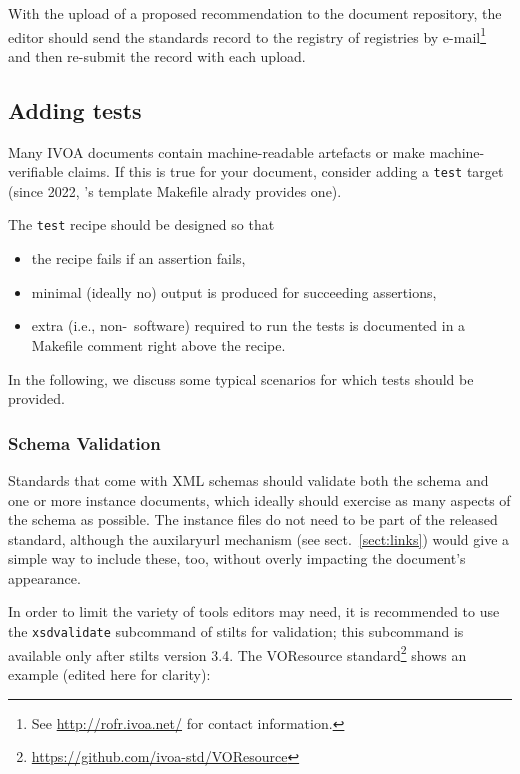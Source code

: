 \documentclass[11pt,a4paper]{ivoa}
\begin{document}
With the upload of a proposed recommendation to the document repository,
the editor should send the standards record to the registry of
registries by e-mail\footnote{See \url{http://rofr.ivoa.net/} for
contact information.} and then re-submit the record with each upload.


\subsection{Adding tests}

Many IVOA documents contain machine-readable artefacts or make
machine-verifiable claims.  If this is true for your document, consider
adding a \verb|test| target (since 2022, \ivoatex's template Makefile
alrady provides one).

The \verb|test| recipe should be designed so that

\begin{itemize}
\item the recipe fails if an assertion fails,
\item minimal (ideally no) output is produced for succeeding assertions,
\item extra (i.e., non-\ivoatex~software) required to run the tests is
documented in a Makefile comment right above the recipe.
\end{itemize}

In the following, we discuss some typical scenarios for which tests
should be provided.

\subsubsection{Schema Validation}

Standards that come with XML schemas should validate both the schema and
one or more instance documents, which ideally should exercise as many
aspects of the schema as possible.  The instance files do not need to be
part of the released standard, although the auxilaryurl mechanism (see
sect.~\ref{sect:links}) would give a simple way to include these, too,
without overly impacting the document's appearance.

In order to limit the variety of tools editors may need, it is
recommended to use the \verb|xsdvalidate| subcommand of stilts
\citep{2006ASPC..351..666T} for validation; this subcommand is available
only after stilts version 3.4.  The VOResource
standard\footnote{\url{https://github.com/ivoa-std/VOResource}} shows an
example (edited here for clarity):
\end{document}
